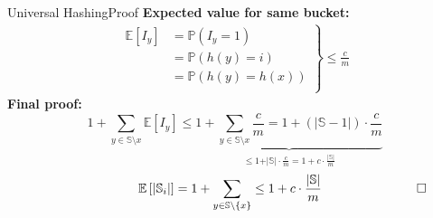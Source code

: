 \begin{frame}{Universal Hashing}{Proof}
  \textbf{Expected value for same bucket:}
  \begin{align*}
    \left.\begin{array}{rl}
      \mathbb{E}[I_y] & = \mathbb{P}(I_y = 1)\\
      {} & = \mathbb{P}(h(y) = i)\\
      {} & = \mathbb{P}(h(y) = h(x))\\
    \end{array}\right\rbrace
    \leq \frac{c}{m}
  \end{align*}
  \textbf{Final proof:}
  \[
    1 + \sum_{y \in \mathbb{S} \setminus x} \mathbb{E}[I_y]
    \leq
    \underbrace{
      1 + \sum_{y \in \mathbb{S} \setminus x} \frac{c}{m}
        = 1 + \left(\vert \mathbb{S} - 1 \vert \right) \cdot \frac{c}{m}
    }_{
      \displaystyle \leq 1 + \vert \mathbb{S} \vert \cdot \frac{c}{m}
        = 1 + c \cdot \frac{\vert \mathbb{S} \vert}{m}
    }
  \]
  \[\hspace*{7.5em}
    \mathbb{E}\left[\vert \mathbb{S}_i \vert\right]
      = 1 + \sum_{y \in \mathbb{S} \setminus \{x\}}
      \leq 1 + c \cdot \frac{\vert \mathbb{S} \vert}{m}
    \hspace*{7.5em}\square
  \]
\end{frame}
